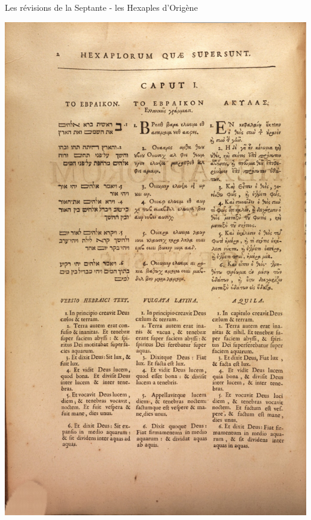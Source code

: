 \documentclass[11pt]{beamer}
\begin{document}
\begin{frame}{Les révisions de la Septante - les Hexaples d'Origène}
\begin{minipage}{0.48\textwidth}
    \centering
    \includegraphics[width=\textwidth]{img/origen_left.jpg}
\end{minipage}
\hfill
\begin{minipage}{0.48\textwidth}
    \centering

\end{minipage}
\end{frame}
\end{document}
